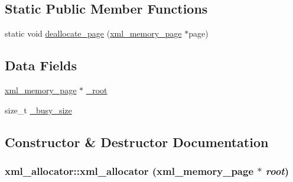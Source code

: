 \subsection*{Static Public Member Functions}
\begin{DoxyCompactItemize}
\item 
static void \hyperlink{structxml__allocator_a1c6bfe15a257a094f55659f8d71c209e}{deallocate\_\-page} (\hyperlink{structxml__memory__page}{xml\_\-memory\_\-page} $\ast$page)
\end{DoxyCompactItemize}
\subsection*{Data Fields}
\begin{DoxyCompactItemize}
\item 
\hyperlink{structxml__memory__page}{xml\_\-memory\_\-page} $\ast$ \hyperlink{structxml__allocator_a38082e85b23743620a257f997a00bb69}{\_\-root}
\item 
size\_\-t \hyperlink{structxml__allocator_a4908b4aaa8cbbc3bf936ab8a938053c0}{\_\-busy\_\-size}
\end{DoxyCompactItemize}


\subsection{Constructor \& Destructor Documentation}
\hypertarget{structxml__allocator_ad41b1a18595953aa71a470b45921c0fd}{
\subsubsection[{xml\_\-allocator}]{\setlength{\rightskip}{0pt plus 5cm}xml\_\-allocator::xml\_\-allocator ({\bf xml\_\-memory\_\-page} $\ast$ {\em root})}}
\label{structxml__allocator_ad41b1a18595953aa71a470b45921c0fd}


